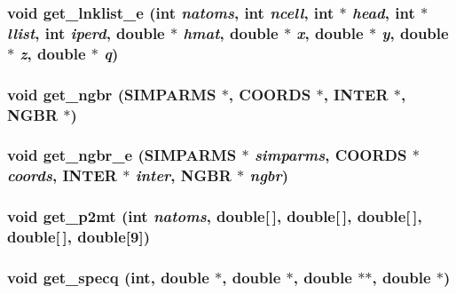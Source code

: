 \subsubsection{\setlength{\rightskip}{0pt plus 5cm}void get\_\-lnklist\_\-e (int {\em natoms}, int {\em ncell}, int $\ast$ {\em head}, int $\ast$ {\em llist}, int {\em iperd}, double $\ast$ {\em hmat}, double $\ast$ {\em x}, double $\ast$ {\em y}, double $\ast$ {\em z}, double $\ast$ {\em q})}\label{energy_2proto__energy_8h_9f6f52ca3256c3852f909b9e516e6db7}


\subsubsection{\setlength{\rightskip}{0pt plus 5cm}void get\_\-ngbr ({\bf SIMPARMS} $\ast$, {\bf COORDS} $\ast$, {\bf INTER} $\ast$, {\bf NGBR} $\ast$)}\label{energy_2proto__energy_8h_2cf55917210d416ab3eb6fd8ca670603}


\subsubsection{\setlength{\rightskip}{0pt plus 5cm}void get\_\-ngbr\_\-e ({\bf SIMPARMS} $\ast$ {\em simparms}, {\bf COORDS} $\ast$ {\em coords}, {\bf INTER} $\ast$ {\em inter}, {\bf NGBR} $\ast$ {\em ngbr})}\label{energy_2proto__energy_8h_e19a02adb55a4a08cee0ce46ae4d5b1b}


\subsubsection{\setlength{\rightskip}{0pt plus 5cm}void get\_\-p2mt (int {\em natoms}, double[$\,$], double[$\,$], double[$\,$], double[$\,$], double[9])}\label{energy_2proto__energy_8h_deacb459bc22df48ea06c1d2aa3322bd}


\subsubsection{\setlength{\rightskip}{0pt plus 5cm}void get\_\-specq (int, double $\ast$, double $\ast$, double $\ast$$\ast$, double $\ast$)}\label{energy_2proto__energy_8h_406732c4e18fa3c362d721d1f9188817}


